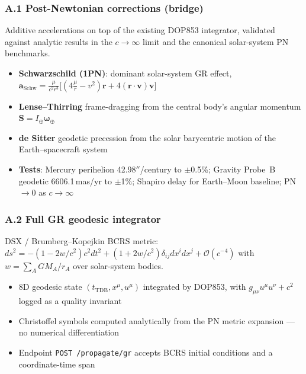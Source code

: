\documentclass[11pt, a4paper]{article}
\begin{document}
\subsubsection{A.1 Post-Newtonian corrections (bridge)}

Additive accelerations on top of the existing DOP853 integrator, validated
against analytic results in the $c \to \infty$ limit and the canonical
solar-system PN benchmarks.

\begin{itemize}[leftmargin=*]
  \item \textbf{Schwarzschild (1PN)}: dominant solar-system GR effect,
        $\mathbf{a}_\text{Schw} = \tfrac{\mu}{c^2 r^3}\big[(4\tfrac{\mu}{r} - v^2)\mathbf{r} + 4(\mathbf{r}\!\cdot\!\mathbf{v})\mathbf{v}\big]$
  \item \textbf{Lense--Thirring} frame-dragging from the central body's
        angular momentum $\mathbf{S} = I_\oplus \boldsymbol{\omega}_\oplus$
  \item \textbf{de Sitter} geodetic precession from the solar barycentric
        motion of the Earth--spacecraft system
  \item \textbf{Tests}: Mercury perihelion 42.98$''$/century to $\pm$0.5\%;
        Gravity Probe~B geodetic 6606.1\,mas/yr to $\pm$1\%; Shapiro delay
        for Earth--Moon baseline; PN $\to 0$ as $c \to \infty$
\end{itemize}

\subsubsection{A.2 Full GR geodesic integrator}

DSX / Brumberg--Kopejkin BCRS metric:
$ds^2 = -(1 - 2w/c^2)c^2 dt^2 + (1 + 2w/c^2)\delta_{ij} dx^i dx^j + \mathcal{O}(c^{-4})$
with $w = \sum_A G M_A / r_A$ over solar-system bodies.

\begin{itemize}[leftmargin=*]
  \item 8D geodesic state $(t_\text{TDB}, x^\mu, u^\mu)$ integrated by
        DOP853, with $g_{\mu\nu}u^\mu u^\nu + c^2$ logged as a quality
        invariant
  \item Christoffel symbols computed analytically from the PN metric
        expansion --- no numerical differentiation
  \item Endpoint \texttt{POST /propagate/gr} accepts BCRS initial
        conditions and a coordinate-time span
\end{itemize}
\end{document}
